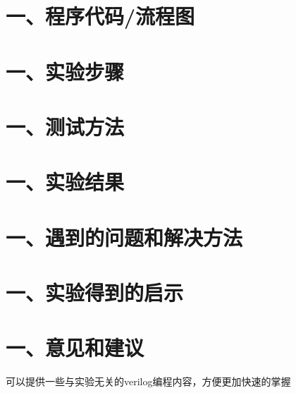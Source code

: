 \documentclass{report}
\begin{document}
\section*{一、程序代码/流程图}
\section*{一、实验步骤}
\section*{一、测试方法}
\section*{一、实验结果}
\section*{一、遇到的问题和解决方法}
\section*{一、实验得到的启示}
\section*{一、意见和建议}
可以提供一些与实验无关的verilog编程内容，方便更加快速的掌握
\end{document}
